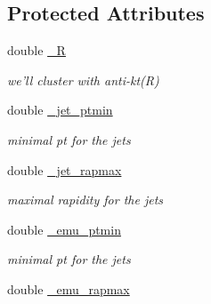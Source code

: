 \subsection*{Protected Attributes}
\begin{CompactItemize}
\item 
\hypertarget{classHZAnalysis_bb92f8f241ae3a93aec6439e9e2b5c77}{
double \hyperlink{classHZAnalysis_bb92f8f241ae3a93aec6439e9e2b5c77}{\_\-R}}
\label{classHZAnalysis_bb92f8f241ae3a93aec6439e9e2b5c77}

\begin{CompactList}\small\item\em we'll cluster with anti-kt(R) \item\end{CompactList}\item 
\hypertarget{classHZAnalysis_9c9cb7a47718819a4441e3e37d22a37d}{
double \hyperlink{classHZAnalysis_9c9cb7a47718819a4441e3e37d22a37d}{\_\-jet\_\-ptmin}}
\label{classHZAnalysis_9c9cb7a47718819a4441e3e37d22a37d}

\begin{CompactList}\small\item\em minimal pt for the jets \item\end{CompactList}\item 
\hypertarget{classHZAnalysis_6b416813d5dd0d238511fd5214f2849d}{
double \hyperlink{classHZAnalysis_6b416813d5dd0d238511fd5214f2849d}{\_\-jet\_\-rapmax}}
\label{classHZAnalysis_6b416813d5dd0d238511fd5214f2849d}

\begin{CompactList}\small\item\em maximal rapidity for the jets \item\end{CompactList}\item 
\hypertarget{classHZAnalysis_1e51dc48a3c6631e186669f91a78e1f0}{
double \hyperlink{classHZAnalysis_1e51dc48a3c6631e186669f91a78e1f0}{\_\-emu\_\-ptmin}}
\label{classHZAnalysis_1e51dc48a3c6631e186669f91a78e1f0}

\begin{CompactList}\small\item\em minimal pt for the jets \item\end{CompactList}\item 
\hypertarget{classHZAnalysis_eeb8824968a9bc7d1e5bb684fad72eac}{
double \hyperlink{classHZAnalysis_eeb8824968a9bc7d1e5bb684fad72eac}{\_\-emu\_\-rapmax}}
\label{classHZAnalysis_eeb8824968a9bc7d1e5bb684fad72eac}


\end{CompactItemize}
